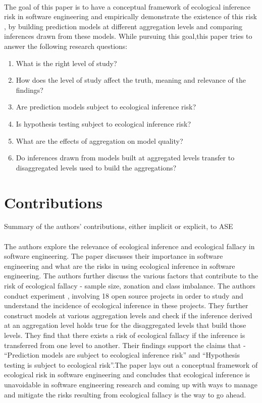 \documentclass[12pt]{article}
\begin{document}
\paragraph{}The goal of this paper is to have a conceptual framework of ecological inference risk in software engineering and empirically demonstrate the existence of this risk , by building
  prediction models at different aggregation levels and comparing inferences drawn from these models. While pursuing this goal,this paper tries to answer the following research questions:
\begin{enumerate}
  \item What is the right level of study?
  \item How does the level of study affect the truth, meaning and relevance of the findings?
  \item Are prediction models subject to ecological inference risk?
  \item Is hypothesis testing subject to ecological inference risk?
  \item What are the effects of aggregation on model quality?
  \item Do inferences drawn from models built at aggregated levels transfer to disaggregated levels used to build the aggregations?
\end{enumerate}


\section{Contributions}\label{contrib}
Summary of the authors' contributions, either implicit or explicit, to ASE
\paragraph{} The authors explore the relevance of ecological inference and ecological fallacy in software engineering. The paper discusses their importance in software engineering and 
what are the risks in using ecological inference in software engineering. The authors further discuss the various factors that contribute to the risk of ecological fallacy - sample size,
zonation and class imbalance. The authors conduct experiment , involving 18 open source projects in order to study and understand the incidence of ecological inference in these projects.
They further construct models at various aggregation levels and check if the inference derived at an aggregation level holds true for the disaggregated levels that build those levels. They find
that there exists a risk of ecological fallacy if the inference is transferred from one level to another. Their findings support the claims that - ``Prediction models are subject to ecological
inference risk'' and ``Hypothesis testing is subject to ecological risk''.The paper lays out a conceptual framework of ecological risk in software engineering and concludes that ecological
inference is unavoidable in software engineering research and coming up with ways to manage and mitigate the risks resulting from ecological fallacy is the way to go ahead.
\end{document}

